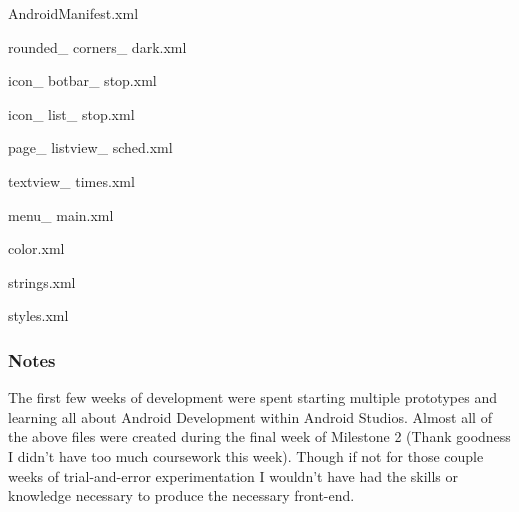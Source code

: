 \documentclass[a4paper,12pt]{article}
\begin{document}
AndroidManifest.xml

rounded\_ corners\_ dark.xml

icon\_ botbar\_ stop.xml

icon\_ list\_ stop.xml

page\_  listview\_  sched.xml

textview\_  times.xml

menu\_ main.xml

color.xml

strings.xml

styles.xml


\subsubsection{Notes}
The first few weeks of development were spent starting multiple prototypes and learning all about Android Development within Android Studios. Almost all of the above files were created during the final week of Milestone 2 (Thank goodness I didn’t have too much coursework this week). Though if not for those couple weeks of trial-and-error experimentation I wouldn’t have had the skills or knowledge necessary to produce the necessary front-end.
\end{document}

